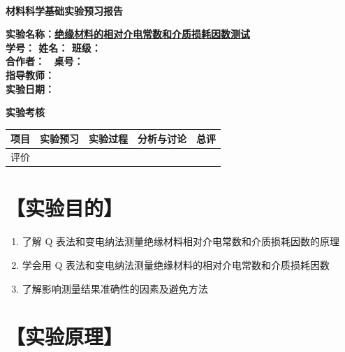 \documentclass[a4paper,utf8]{article}
\begin{document}
\begin{center}
    {\mbox{}\\[7em]\bfseries\songti%
    材料科学基础实验预习报告}\\[34mm]
    {\bfseries\songti
    实验名称：\uline{\hfill\mbox{绝缘材料的相对介电常数和介质损耗因数测试}\hfill} \\[2.9mm]
    学\quad 号：\uline{}\hfill
    姓\quad 名：\uline{}\hfill
    班\quad 级：\uline{} \\[2.9mm]
    合作者：\uline{\makebox[25mm]{}}\enspace~
    桌\quad 号：\uline{\makebox[25mm]{}}\hfill\mbox{}\\[2.9mm]
    指导教师：\uline{}\hfill\mbox{} \\[2.9mm]
    实验日期：\uline{\makebox[30mm]{}}\hfill\mbox{} \\[58.7mm]
    {\bfseries\songti
    实验考核\\[3mm]
    \extrarowheight=3mm
    \begin{tabularx}{150mm}{|X|X|X|X|X|}\hline
        \hfil 项目 \hfil  & \hfil 实验预习 \hfil & \hfil 实验过程 \hfil & \hfil 分析与讨论 \hfil & \hfil 总评 \hfil \\[3mm] \hline
        \hfil 评价 \hfil &  &  &  &  \\[3mm] \hline
    \end{tabularx}
    }
    }
\end{center}
\newpage
\section*{【实验目的】}
    \begin{enumerate}
        \item 了解 Q 表法和变电纳法测量绝缘材料相对介电常数和介质损耗因数的原理
        \item 学会用 Q 表法和变电纳法测量绝缘材料的相对介电常数和介质损耗因数
        \item 了解影响测量结果准确性的因素及避免方法
    \end{enumerate}
\section*{【实验原理】}%
\end{document}
